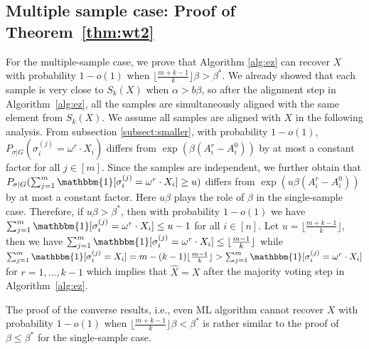 \documentclass[conference]{IEEEtran}
\begin{document}
\subsection{Multiple sample case: Proof of Theorem~\ref{thm:wt2}}
\label{sect:multi}


For the multiple-sample case,
we prove that Algorithm \ref{alg:ez} can recover $X$ with probability $1-o(1)$ when $\lfloor \frac{m+k-1}{k} \rfloor \beta>\beta^\ast$.
We already showed that each sample is very close to $S_k(X)$ when $\alpha > b \beta$,
so after the alignment step in Algorithm~\ref{alg:ez},
all the samples are simultaneously aligned with the same element from $S_k(X)$.
We assume all samples are aligned with $X$ in the following analysis.
From subsection \ref{subsect:smaller},
with probability $1-o(1)$, $P_{\sigma|G}(\sigma_i^{(j)}  = \omega^r \cdot X_i)$ differs from
$ \exp (\beta (A^r_i-A^0_i))$ by at most a constant factor for all $j\in[m]$.
Since the samples are independent,
we further obtain that $P_{\sigma|G}(\sum_{j=1}^m\mathbbm{1}[\sigma_i^{(j)}  = \omega^r \cdot X_i]\ge u)$ differs from
$ \exp ( u \beta (A^r_i-A^0_i))$
by at most a constant factor.
Here $u\beta$ plays the role of $\beta$ in the single-sample case.
Therefore, if $u\beta>\beta^\ast$, then with probability $1-o(1)$ we have $\sum_{j=1}^m\mathbbm{1}[\sigma_i^{(j)} = \omega^r \cdot X_i] \le u-1$ for all $i\in[n]$. Let $u=\lfloor \frac{m+k-1}{k} \rfloor$,
then we have $\sum_{j=1}^m\mathbbm{1}[\sigma_i^{(j)}  = \omega^r \cdot X_i] \le \lfloor \frac{m-1}{k} \rfloor $
while $\sum_{j=1}^m\mathbbm{1}[\sigma_i^{(j)} = X_i]
= m - (k-1)\lfloor \frac{m-1}{k} \rfloor > \sum_{j=1}^m\mathbbm{1}[\sigma_i^{(j)}  = \omega^r \cdot X_i] $ for $r=1, \dots, k-1$
which implies that $\hat{X}=X$ after the majority voting step in Algorithm~\ref{alg:ez}.

The proof of the converse results, i.e., even ML algorithm cannot recover $X$ with probability $1-o(1)$ when
$\lfloor \frac{m+k-1}{k} \rfloor  \beta < \beta^\ast$ is rather similar to the proof of $\beta\le\beta^\ast$ for the single-sample case.



\end{document}
